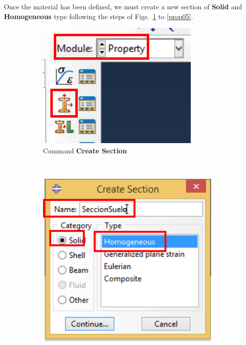 Once the material has been defined, we must create a new section of
\textbf{Solid} and \textbf{Homogeneous} type following the steps of
Figs.~\ref{prop03p} to \ref{prop05}.
\begin{figure}[!h]
  \centering
  \begin{subfigure}[!h]{0.20\textwidth}
    \includegraphics[width=\textwidth]{./body/images/prop03p.pdf}
    \caption{Command \textbf{Create Section}}
    \label{prop03p}
  \end{subfigure}%
  ~
  \begin{subfigure}[!h]{0.39\textwidth}
    \includegraphics[width=\textwidth]{./body/images/prop04.pdf}

\end{subfigure}
\end{figure}
